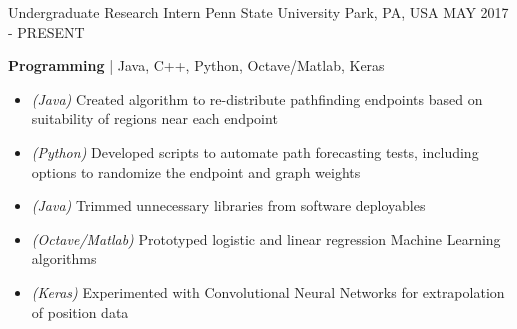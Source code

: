 
\vspace{-.5em}
\begin{cventries}

	\cventry
	{Undergraduate Research Intern} %
	{Penn State} %
	{University Park, PA, USA} %
	{MAY 2017 - PRESENT} %
	{
		\begin{cvitems} %
			\item {\textbf{Programming} | {\color{awesome}Java, C++, Python, Octave/Matlab, Keras}
				\begin{itemize}[noitemsep,wide=0pt, leftmargin=\dimexpr{} + 2\relax]
					\item[\textbullet]{\textit{(Java)} Created algorithm to re-distribute pathfinding endpoints based on suitability of regions near each endpoint}
					\item[\textbullet]{\textit{(Python)} Developed scripts to automate path forecasting tests, including options to randomize the endpoint and graph weights}
					\item[\textbullet]{\textit{(Java)} Trimmed unnecessary libraries from software deployables}
					\item[\textbullet]{\textit{(Octave/Matlab)} Prototyped logistic and linear regression Machine Learning algorithms}
					\item[\textbullet]{\textit{(Keras)} Experimented with Convolutional Neural Networks for extrapolation of position data}
				\end{itemize}}
		\end{cvitems}
	}


\end{cventries}
